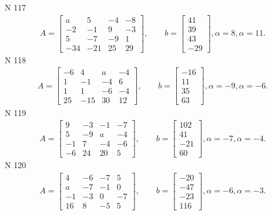\documentclass[11pt]{report}
\begin{document}
N 117
\begin{align*}
 A = \left[\begin{matrix}a & 5 & -4 & -8\\-2 & -1 & 9 & -3\\5 & -7 & -9 & 1\\-34 & -21 & 25 & 29\end{matrix}\right],
    \qquad b = \left[\begin{matrix}41\\39\\43\\-29\end{matrix}\right], \alpha = 8, \alpha = 11. 
 \end{align*}
N 118
\begin{align*}
 A = \left[\begin{matrix}-6 & 4 & a & -4\\1 & -1 & -4 & 6\\1 & 1 & -6 & -4\\25 & -15 & 30 & 12\end{matrix}\right],
    \qquad b = \left[\begin{matrix}-16\\11\\35\\63\end{matrix}\right], \alpha = -9, \alpha = -6. 
 \end{align*}
N 119
\begin{align*}
 A = \left[\begin{matrix}9 & -3 & -1 & -7\\5 & -9 & a & -4\\-1 & 7 & -4 & -6\\-6 & 24 & 20 & 5\end{matrix}\right],
    \qquad b = \left[\begin{matrix}102\\41\\-21\\60\end{matrix}\right], \alpha = -7, \alpha = -4. 
 \end{align*}
N 120
\begin{align*}
 A = \left[\begin{matrix}4 & -6 & -7 & 5\\a & -7 & -1 & 0\\-1 & -3 & 0 & -7\\16 & 8 & -5 & 5\end{matrix}\right],
    \qquad b = \left[\begin{matrix}-20\\-47\\-23\\116\end{matrix}\right], \alpha = -6, \alpha = -3. 
 \end{align*}
\end{document}
